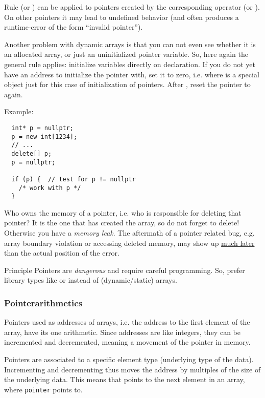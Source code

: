 \begin{guideline}{Rule}
   (or ) can be applied to pointers created by the corresponding operator  (or ). On other pointers
  it may lead to undefined behavior (and often produces a runtime-error of the form ``invalid pointer'').
\end{guideline}

Another problem with dynamic arrays is that you can not even see whether it is an allocated array, or just an uninitialized pointer variable. So,
here again the general rule applies: initialize variables directly on declaration. If you do not yet have an address to initialize the pointer with,
set it to zero, i.e.
%
%
where  is a special object just for this case of initialization of pointers. After , reset the pointer to  again.

Example:
\begin{verbatim}
  int* p = nullptr;
  p = new int[1234];
  // ...
  delete[] p;
  p = nullptr;

  if (p) {  // test for p != nullptr
    /* work with p */
  }
\end{verbatim}

Who owns the memory of a pointer, i.e. who is responsible for deleting that pointer? It is the one that has created the array, so do not forget to delete!
Otherwise you have a \emph{memory leak}. The aftermath of a pointer related bug, e.g. array boundary violation or accessing deleted memory, may show up \underline{much later} than the actual position of the error.

\begin{guideline}{Principle}
  Pointers are \emph{dangerous} and require careful programming. So, prefer library types like  or  instead of
  (dynamic/static) arrays.
\end{guideline}


\subsubsection{Pointerarithmetics}
Pointers used as addresses of arrays, i.e. the address to the first element of the array, have its one arithmetic. Since addresses are like integers,
they can be incremented and decremented, meaning a movement of the pointer in memory.

Pointers are associated to a specific element type (underlying type of the data). Incrementing and decrementing thus moves the address by multiples of
the size of the underlying data. This means that  points to the next element in an array, where \texttt{pointer} points to.

